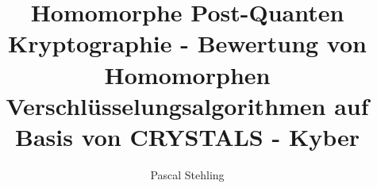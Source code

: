 \documentclass{fiwthesis}
\title{Homomorphe Post-Quanten Kryptographie - Bewertung von Homomorphen Verschlüsselungsalgorithmen auf Basis von CRYSTALS - Kyber}
\author{Pascal Stehling}
\begin{document}
\maketitle






% 





\singlespacing

\listofreferences


\printglossary

\printindex

\normalspacing
\end{document}
